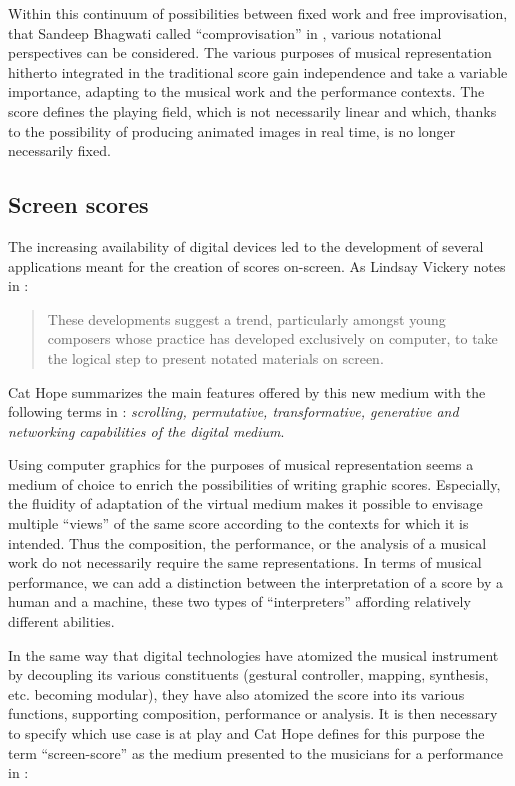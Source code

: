 Within this continuum of possibilities between fixed work and free improvisation, that Sandeep Bhagwati called “comprovisation” in \cite{bhagwati_notational_2013}, various notational perspectives can be considered. The various purposes of musical representation hitherto integrated in the traditional score gain independence and take a variable importance, adapting to the musical work and the performance contexts. The score defines the playing field, which is not necessarily linear and which, thanks to the possibility of producing animated images in real time, is no longer necessarily fixed.

\subsection{Screen scores}
The increasing availability of digital devices led to the development of several applications meant for the creation of scores on-screen. As Lindsay Vickery notes in \cite{vickery_limitations_2014} :

\begin{quotation}
These developments suggest a trend, particularly amongst young composers whose practice has developed exclusively on computer, to take the logical step to present notated materials on screen.
\end{quotation}

Cat Hope summarizes the main features offered by this new medium with the following terms in \cite{hope_screen_2011}: \textit{scrolling, permutative, transformative, generative and networking capabilities of the digital medium}.

Using computer graphics for the purposes of musical representation seems a medium of choice to enrich the possibilities of writing graphic scores. Especially, the fluidity of adaptation of the virtual medium makes it possible to envisage multiple “views” of the same score according to the contexts for which it is intended. Thus the composition, the performance, or the analysis of a musical work do not necessarily require the same representations. In terms of musical performance, we can add a distinction between the interpretation of a score by a human and a machine, these two types of “interpreters” affording relatively different abilities.

In the same way that digital technologies have atomized the musical instrument by decoupling its various constituents (gestural controller, mapping, synthesis, etc. becoming modular), they have also atomized the score into its various functions, supporting composition, performance or analysis. It is then necessary to specify which use case is at play and Cat Hope defines for this purpose the term “screen-score” as the medium presented to the musicians for a performance in \cite{hope_screen_2011} :





